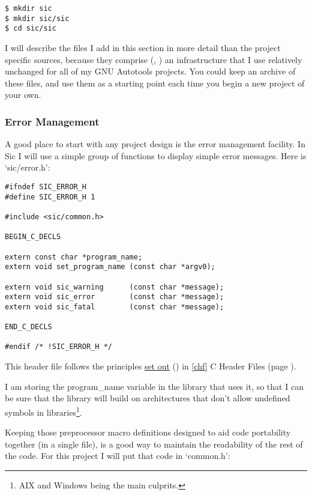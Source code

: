 \begin{Verbatim}[frame=single]
$ mkdir sic
$ mkdir sic/sic
$ cd sic/sic
\end{Verbatim}

I will describe the files I add in this section in more detail than the 
project specific sources, because they comprise ({\MdQ{}}, {\MdQ{}}) an infrastructure 
that I use relatively unchanged for all of my GNU Autotools projects. You 
could keep an archive of these files, and use them as a starting point each 
time you begin a new project of your own. 

\subsubsection{Error Management}

A good place to start with any project design is the error management facility. In Sic I will use a simple group of functions to display simple error messages. Here is `sic/error.h': 

\begin{Verbatim}[frame=single]
#ifndef SIC_ERROR_H
#define SIC_ERROR_H 1

#include <sic/common.h>

BEGIN_C_DECLS

extern const char *program_name;
extern void set_program_name (const char *argv0);

extern void sic_warning      (const char *message);
extern void sic_error        (const char *message);
extern void sic_fatal        (const char *message);

END_C_DECLS

#endif /* !SIC_ERROR_H */
\end{Verbatim}

This header file follows the principles \underline{set out} ({\McQ{}})
in \ref{chf} C Header Files (page \pageref{chf}).


I am storing the program\_{}name variable in the library that uses it, so that 
I can be sure that the library will build on architectures that don't 
allow undefined symbols in libraries\footnote{AIX and Windows being the main 
culprits.}. 


Keeping those preprocessor macro definitions designed to aid code portability 
together (in a single file), is a good way to maintain the readability of 
the rest of the code. For this project I will put that code in `common.h': 


